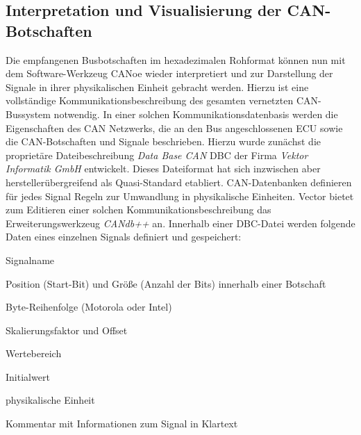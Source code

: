 \begin{comment}
	Botschaftsrahmen, Datenbytes
	Python Package can:
	Initialisierung des physischen Bus
	Definition der Messages
	"Dies entspricht der in der Datenbasis angelegten Identifiern, die im nächsten Abschnitt näher erläutert werden."
	Senden der Busbotschaft innerhalb callback
	Deabonnieren, wenn Diagnose passiv ist
\end{comment}



\subsection{Interpretation und Visualisierung der CAN-Botschaften}\label{subsec:ImplementierungCANoe}

Die empfangenen Busbotschaften im hexadezimalen Rohformat können nun mit dem Software-Werkzeug CANoe wieder interpretiert und zur Darstellung der Signale in ihrer physikalischen Einheit gebracht werden. Hierzu ist eine vollständige Kommunikationsbeschreibung des gesamten vernetzten CAN-Bussystem notwendig. In einer solchen Kommunikationsdatenbasis werden die Eigenschaften des CAN Netzwerks, die an den Bus angeschlossenen \acs{ECU} sowie die CAN-Botschaften und Signale beschrieben. Hierzu wurde zunächst die proprietäre Dateibeschreibung \emph{Data Base CAN} \acs{DBC} der Firma \emph{Vektor Informatik GmbH} entwickelt. Dieses Dateiformat hat sich inzwischen aber herstellerübergreifend als Quasi-Standard etabliert. CAN-Datenbanken definieren für jedes Signal Regeln zur Umwandlung in physikalische Einheiten. Vector bietet zum Editieren einer solchen Kommunikationsbeschreibung das Erweiterungswerkzeug \emph{CANdb++} an. Innerhalb einer DBC-Datei werden folgende Daten eines einzelnen Signals definiert und gespeichert:

\begin{compactitem}
	\item Signalname
	\item Position (Start-Bit) und Größe (Anzahl der Bits) innerhalb einer Botschaft
	\item Byte-Reihenfolge (Motorola oder Intel)
	\item Skalierungsfaktor und Offset
	\item Wertebereich
	\item Initialwert
	\item physikalische Einheit
	\item Kommentar mit Informationen zum Signal in Klartext
\end{compactitem}

